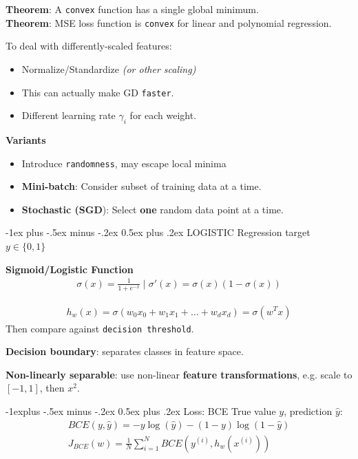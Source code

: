 \documentclass[10pt, landscape]{article}
\makeatletter
\renewcommand{\section}{\@startsection{section}{1}{0mm}%
                                {-1ex plus -.5ex minus -.2ex}%
                                {0.5ex plus .2ex}%
                                {\normalfont\large\bfseries}}
\renewcommand{\subsection}{\@startsection{subsection}{2}{0mm}%
                                {-1explus -.5ex minus -.2ex}%
                                {0.5ex plus .2ex}%
                                {\normalfont\normalsize\bfseries}}
\newcommand{\code}[1]{\textcolor{myred}{\texttt{#1}}}
\makeatother
\begin{document}
\begin{multicols}{4}
\vspace{2pt}
\textbf{Theorem}: A \code{convex} function has a single global minimum.\\
\textbf{Theorem}: MSE loss function is \code{convex} for linear and polynomial regression.
\vspace{2pt}

To deal with differently-scaled features:
\begin{itemize}
    \item Normalize/Standardize \textit{(or other scaling)}
    \item This can actually make GD \code{faster}.
    \item Different learning rate $\gamma_i$ for each weight.
\end{itemize}


\textbf{Variants}
\begin{itemize}
    \item Introduce \code{randomness}, may escape local minima
    \item \textbf{Mini-batch}: Consider subset of training data at a time.
    \item \textbf{Stochastic (SGD}): Select \textbf{one} random data point at a time.
\end{itemize}

\section{LOGISTIC Regression}
target $y \in \{0,1\}$

\vspace{6pt}
\textbf{Sigmoid/Logistic Function}
\begin{align*}
    \sigma(x) = \frac{1}{1+e^{-x}} \;\bigg|\; \sigma'(x) = \sigma(x)(1-\sigma(x))
\end{align*}


\begin{align*}
    h_w(x) = \sigma(w_0x_0+w_1x_1+\dots +w_dx_d) = \sigma(w^Tx)
\end{align*}
Then compare against \code{decision threshold}.

\textbf{Decision boundary}: separates classes in feature space.

\vspace{6pt}
\textbf{Non-linearly separable}: use non-linear \textbf{feature transformations}, 
e.g. scale to $[-1,1]$, then $x^2$.

\subsection{Loss: BCE}
True value $y$, prediction $\hat y$:
\begin{align*}
    BCE(y, \hat y)= -y \log (\hat y) - (1-y)\log(1-\hat y)\\
    J_{BCE}(w) = \frac{1}{N}\sum^N_{i=1}BCE \left( y^{(i)}, h_w(x^{(i)})\right)
\end{align*}


\end{multicols}
\end{document}

